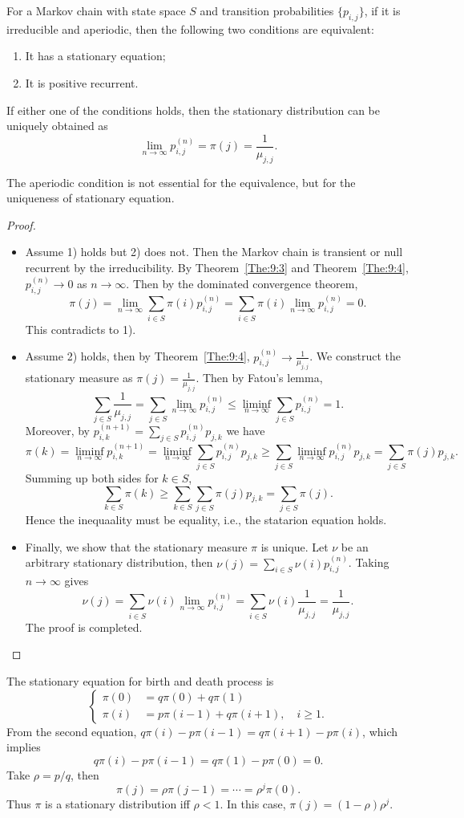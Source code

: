 \begin{theorem}
For a Markov chain with state space $S$ and transition probabilities $\{p_{i,j}\}$,
if it is irreducible and aperiodic, then the following two conditions are equivalent:
\begin{enumerate}
\item
It has a stationary equation;
\item
It is positive recurrent.
\end{enumerate}
If either one of the conditions holds, then the stationary distribution can be uniquely obtained as
\[
\lim_{n\to\infty}p_{i,j}^{(n)}=\pi(j)=\frac{1}{\mu_{j,j}}.
\]
\end{theorem}
The aperiodic condition is not essential for the equivalence, but for the uniqueness of stationary equation.
\begin{proof}
\begin{itemize}
\item
Assume 1) holds but 2) does not.
Then the Markov chain is transient or null recurrent by the irreducibility.
By Theorem~\ref{The:9:3} and Theorem~\ref{The:9:4}, 
$p_{i,j}^{(n)}\to0$ as $n\to\infty$.
Then by the dominated convergence theorem,
\[
\pi(j)=\lim_{n\to\infty}\sum_{i\in S}\pi(i)p_{i,j}^{(n)}=\sum_{i\in S}\pi(i)\lim_{n\to\infty}p_{i,j}^{(n)}=0.
\]
This contradicts to 1).
\item
Assume 2) holds, then by Theorem~\ref{The:9:4}, $p_{i,j}^{(n)}\to\frac{1}{\mu_{j,j}}$.
We construct the stationary measure as $\pi(j)=\frac{1}{\mu_{j,j}}$.
Then by Fatou's lemma,
\[
\sum_{j\in S}\frac{1}{\mu_{j,j}}=\sum_{j\in S}\lim_{n\to\infty}p_{i,j}^{(n)}\le
\liminf_{n\to\infty}\sum_{j\in S}p_{i,j}^{(n)}=1.
\]
Moreover, by $p_{i,k}^{(n+1)}=\sum_{j\in S}p_{i,j}^{(n)}p_{j,k}$ we have
\[
\pi(k)=\liminf_{n\to\infty}p_{i,k}^{(n+1)}=\liminf_{n\to\infty}\sum_{j\in S}p_{i,j}^{(n)}p_{j,k}
\ge
\sum_{j\in S}\liminf_{n\to\infty}p_{i,j}^{(n)}p_{j,k}
=
\sum_{j\in S}\pi(j)p_{j,k}.
\]
Summing up both sides for $k\in S$,
\[
\sum_{k\in S}\pi(k)\ge \sum_{k\in S}\sum_{j\in S}\pi(j)p_{j,k}=\sum_{j\in S}\pi(j).
\]
Hence the inequaality must be equality, i.e., the statarion equation holds.
\item
Finally, we show that the stationary measure $\pi$ is unique.
Let $\nu$ be an arbitrary stationary distribution, then $\nu(j)=\sum_{i\in S}\nu(i)p_{i,j}^{(n)}$.
Taking $n\to\infty$ gives
\[
\nu(j)=\sum_{i\in S}\nu(i)\lim_{n\to\infty}p_{i,j}^{(n)}=\sum_{i\in S}\nu(i)\frac{1}{\mu_{j,j}}=\frac{1}{\mu_{j,j}}.
\]
The proof is completed.
\end{itemize}
\end{proof}
\begin{example}
The stationary equation for birth and death process is
\[
\left\{
\begin{aligned}
\pi(0)&=q\pi(0)+q\pi(1)\\
\pi(i)&=p\pi(i-1)+q\pi(i+1),\quad i\ge1.
\end{aligned}
\right.
\]
From the second equation, $q\pi(i)-p\pi(i-1)=q\pi(i+1)-p\pi(i)$, which implies
\[
q\pi(i)-p\pi(i-1)=q\pi(1)-p\pi(0)=0.
\]
Take $\rho=p/q$, then
\[
\pi(j)=\rho \pi(j-1)=\cdots=\rho^j\pi(0).
\]
Thus $\pi$ is a stationary distribution iff $\rho<1$.
In this case, $\pi(j)=(1-\rho)\rho^j$.
\end{example}


